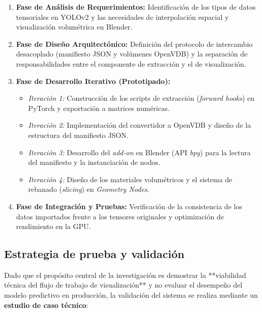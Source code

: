 \begin{enumerate}
    \item \textbf{Fase de Análisis de Requerimientos:} Identificación de los tipos de datos tensoriales en 
    YOLOv2 y las necesidades de interpolación espacial y visualización volumétrica en Blender.
    \item \textbf{Fase de Diseño Arquitectónico:} Definición del protocolo de intercambio desacoplado 
    (manifiesto JSON y volúmenes OpenVDB) y la separación de responsabilidades entre el componente de 
    extracción y el de visualización.
    \item \textbf{Fase de Desarrollo Iterativo (Prototipado):} 
    \begin{itemize}
        \item \textit{Iteración 1:} Construcción de los scripts de extracción (\textit{forward hooks}) en 
        PyTorch y exportación a matrices numéricas.
        \item \textit{Iteración 2:} Implementación del convertidor a OpenVDB y diseño de la estructura del 
        manifiesto JSON.
        \item \textit{Iteración 3:} Desarrollo del \textit{add-on} en Blender (API \textit{bpy}) para la 
        lectura del manifiesto y la instanciación de nodos.
        \item \textit{Iteración 4:} Diseño de los materiales volumétricos y el sistema de rebanado 
        (\textit{slicing}) en \textit{Geometry Nodes}.
    \end{itemize}
    \item \textbf{Fase de Integración y Pruebas:} Verificación de la consistencia de los datos importados 
    frente a los tensores originales y optimización de rendimiento en la GPU.
\end{enumerate}

\subsection{Estrategia de prueba y validación}
Dado que el propósito central de la investigación es demostrar la **viabilidad técnica del flujo de trabajo 
de visualización** y no evaluar el desempeño del modelo predictivo en producción, la validación del sistema 
se realiza mediante un \textbf{estudio de caso técnico}:

